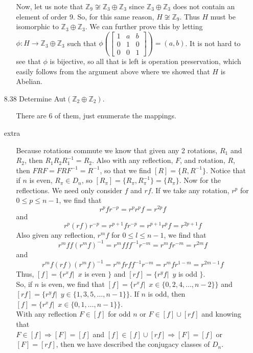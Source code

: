 \documentclass[12pt]{article}
\begin{document}
\begin{enumerate}
\begin{enumerate}
Now, let us note that $\mathbb{Z}_9 \not\cong \mathbb{Z}_3 \oplus \mathbb{Z}_3$ since 
$\mathbb{Z}_3 \oplus \mathbb{Z}_3$ does not contain an element of order 9. So, for this same
reason, $H \not\cong \mathbb{Z}_9$. Thus $H$ must be isomorphic to $\mathbb{Z}_3 \oplus 
\mathbb{Z}_3$. We can further prove this by letting $\phi : H \rightarrow \mathbb{Z}_3 \oplus 
\mathbb{Z}_3$ such that $\phi \left( \left[
\begin{array}{ccc}
1 & a & b \\
0 & 1 & 0 \\
0 & 0 & 1
\end{array}
\right] \right) = (a, b)$. It is not hard to see that $\phi$ is bijective, so all that is left is 
operation preservation, which easily follows from the argument above where we showed that 
$H$ is Abelian.
\end{enumerate}

\item[8.38] Determine Aut$(\mathbb{Z}_2 \oplus \mathbb{Z}_2)$.
\begin{enumerate}
\item[] There are 6 of them, just enumerate the mappings.
\end{enumerate}

\item[extra]
\begin{enumerate}
\item[] Because rotations commute we know that given any 2 rotations, $R_1$ and $R_2$, then
$R_1R_2R_1^{-1} = R_2$. Also with any reflection, $F$, and rotation, $R$, then 
$FRF = FRF^{-1} = R^{-1}$, so that we find $[R] = \{ R, R^{-1} \}$. Notice that if $n$ is even, 
$R_\pi \in D_n$, so $[R_\pi ] = \{ R_\pi , R^{-1}_\pi \} = \{ R_\pi \}$. Now for the reflections. We need 
only consider $f$ and $rf$. If we take any rotation, $r^p$ for $0 \leq p \leq n - 1$, we find 
that 
\[ r^pfr^{-p} = r^pr^pf = r^{2p}f \]
and 
\[
r^p(rf)r^{-p} = r^{p+1}fr^{-p} = r^{p+1}r^pf = r^{2p + 1}f
\]
Also given any reflection, $r^mf$ for $0 \leq l \leq n - 1$, we find that
\[
r^mff(r^mf)^{-1} = r^mfff^{-1}r^{-m} = r^mfr^{-m} = r^{2m}f
\]
and
\[
r^mf(rf)(r^mf)^{-1} = r^mfrff^{-1}r^{-m} = r^mfr^{1 - m} = r^{2m - 1}f
\]
Thus, $[f] = \{ r^xf |\,\,\, x $ is even $\}$ and $[rf] = \{ r^yf |\,\,\, y$ is odd $\}$. \\
So, if $n$ is even, we find that $[f] = \{ r^xf |\,\,\, x \in \{0, 2, 4, \ldots, n-2\}\}$ and
$[rf] = \{ r^yf |\,\,\, y \in \{1, 3, 5, \ldots, n - 1\}\}$. If $n$ is odd, then 
$[f] = \{ r^xf |\,\,\, x \in \{0, 1, \ldots, n - 1\}\}$. \\
With any reflection $F \in [f]$ for odd $n$ or $F \in [f] \cup [rf]$ and knowing that \\
$F \in [f] \Rightarrow [F] = [f]$ and $[f] \in [f] \cup [rf] \Rightarrow [F] = [f]$ or 
$[F] = [rf]$, then we have described the conjugacy classes of $D_n$.
\end{enumerate}


\end{enumerate}
\end{document}
